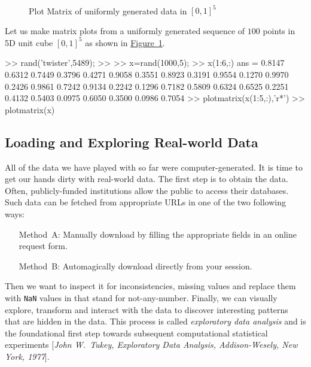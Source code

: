 \begin{figure}[htpb]
\caption{Plot Matrix of uniformly generated data in $[0,1]^5$\label{F:Twister5489X100x5PlotMatrixFirst6andAll100}}
\centering
\mbox{ \hspace{-1.cm}
	    }
\end{figure}

\begin{labwork}\label{LW:matrixplot5DUniform}
Let us make matrix plots from a uniformly generated  sequence of $100$ points in 5D unit cube $[0,1]^5$ as shown in \hyperref[F:Twister5489X100x5PlotMatrixFirst6andAll100]{Figure~\ref*{F:Twister5489X100x5PlotMatrixFirst6andAll100}}.
\begin{VrbM}
>> rand('twister',5489);
>> %
>> x=rand(1000,5);
>> x(1:6,:) %
ans =
    0.8147    0.6312    0.7449    0.3796    0.4271
    0.9058    0.3551    0.8923    0.3191    0.9554
    0.1270    0.9970    0.2426    0.9861    0.7242
    0.9134    0.2242    0.1296    0.7182    0.5809
    0.6324    0.6525    0.2251    0.4132    0.5403
    0.0975    0.6050    0.3500    0.0986    0.7054
>> plotmatrix(x(1:5,:),'r*') %
>> plotmatrix(x) %
\end{VrbM}
\end{labwork}


\subsection{Loading and Exploring Real-world Data}\label{S:EDA}

All of the data we have played with so far were computer-generated.  It is time to get our hands dirty with real-world data.  The first step is to obtain the data.  
Often, publicly-funded institutions allow the public to access their databases.  Such data can be fetched from appropriate URLs in one of the two following ways: 
\begin{itemize}
\item[{\sf Method~A}:] Manually download by filling the appropriate fields in an online request form.
\item[{\sf Method~B}:] Automagically download directly from your \Matlab session.
\end{itemize}
Then we want to inspect it for inconsistencies, missing values and replace them with {\tt NaN} values in \Matlab that stand for not-any-number.  Finally, we can visually explore, transform and interact with the data to discover interesting patterns that are hidden in the data.  This process is called {\em exploratory data analysis} and is the foundational first step towards subsequent computational statistical experiments [{\em John W.~Tukey, Exploratory Data Analysis, Addison-Wesely, New York, 1977}].

